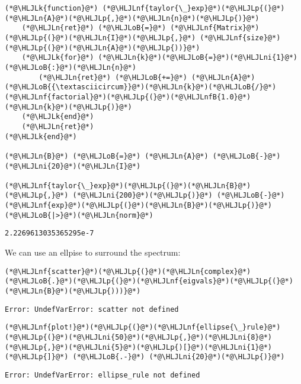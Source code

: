 \documentclass[12pt,a4paper]{article}
\newcommand{\HLJLk}[1]{\textcolor[RGB]{148,91,176}{\textbf{#1}}}
\newcommand{\HLJLn}[1]{#1}
\newcommand{\HLJLnf}[1]{\textcolor[RGB]{66,102,213}{#1}}
\newcommand{\HLJLnfB}[1]{\textcolor[RGB]{59,151,46}{#1}}
\newcommand{\HLJLni}[1]{\textcolor[RGB]{59,151,46}{#1}}
\newcommand{\HLJLoB}[1]{\textcolor[RGB]{102,102,102}{\textbf{#1}}}
\newcommand{\HLJLp}[1]{#1}
\begin{document}
\begin{lstlisting}
(*@\HLJLk{function}@*) (*@\HLJLnf{taylor{\_}exp}@*)(*@\HLJLp{(}@*)(*@\HLJLn{A}@*)(*@\HLJLp{,}@*)(*@\HLJLn{n}@*)(*@\HLJLp{)}@*)
    (*@\HLJLn{ret}@*) (*@\HLJLoB{=}@*) (*@\HLJLnf{Matrix}@*)(*@\HLJLp{(}@*)(*@\HLJLn{I}@*)(*@\HLJLp{,}@*) (*@\HLJLnf{size}@*)(*@\HLJLp{(}@*)(*@\HLJLn{A}@*)(*@\HLJLp{))}@*)
    (*@\HLJLk{for}@*) (*@\HLJLn{k}@*)(*@\HLJLoB{=}@*)(*@\HLJLni{1}@*)(*@\HLJLoB{:}@*)(*@\HLJLn{n}@*)
        (*@\HLJLn{ret}@*) (*@\HLJLoB{+=}@*) (*@\HLJLn{A}@*)(*@\HLJLoB{{\textasciicircum}}@*)(*@\HLJLn{k}@*)(*@\HLJLoB{/}@*)(*@\HLJLnf{factorial}@*)(*@\HLJLp{(}@*)(*@\HLJLnfB{1.0}@*)(*@\HLJLn{k}@*)(*@\HLJLp{)}@*)
    (*@\HLJLk{end}@*)
    (*@\HLJLn{ret}@*)
(*@\HLJLk{end}@*)

(*@\HLJLn{B}@*) (*@\HLJLoB{=}@*) (*@\HLJLn{A}@*) (*@\HLJLoB{-}@*) (*@\HLJLni{20}@*)(*@\HLJLn{I}@*)

(*@\HLJLnf{taylor{\_}exp}@*)(*@\HLJLp{(}@*)(*@\HLJLn{B}@*)(*@\HLJLp{,}@*) (*@\HLJLni{200}@*)(*@\HLJLp{)}@*) (*@\HLJLoB{-}@*)(*@\HLJLnf{exp}@*)(*@\HLJLp{(}@*)(*@\HLJLn{B}@*)(*@\HLJLp{)}@*) (*@\HLJLoB{|>}@*)(*@\HLJLn{norm}@*)
\end{lstlisting}

\begin{lstlisting}
2.2269613035365295e-7
\end{lstlisting}


We can use an ellpise to surround the spectrum:


\begin{lstlisting}
(*@\HLJLnf{scatter}@*)(*@\HLJLp{(}@*)(*@\HLJLn{complex}@*)(*@\HLJLoB{.}@*)(*@\HLJLp{(}@*)(*@\HLJLnf{eigvals}@*)(*@\HLJLp{(}@*)(*@\HLJLn{B}@*)(*@\HLJLp{)))}@*)
\end{lstlisting}

\begin{lstlisting}
Error: UndefVarError: scatter not defined
\end{lstlisting}


\begin{lstlisting}
(*@\HLJLnf{plot!}@*)(*@\HLJLp{(}@*)(*@\HLJLnf{ellipse{\_}rule}@*)(*@\HLJLp{(}@*)(*@\HLJLni{50}@*)(*@\HLJLp{,}@*)(*@\HLJLni{8}@*)(*@\HLJLp{,}@*)(*@\HLJLni{5}@*)(*@\HLJLp{)[}@*)(*@\HLJLni{1}@*)(*@\HLJLp{]}@*) (*@\HLJLoB{.-}@*) (*@\HLJLni{20}@*)(*@\HLJLp{)}@*)
\end{lstlisting}

\begin{lstlisting}
Error: UndefVarError: ellipse_rule not defined
\end{lstlisting}
\end{document}
